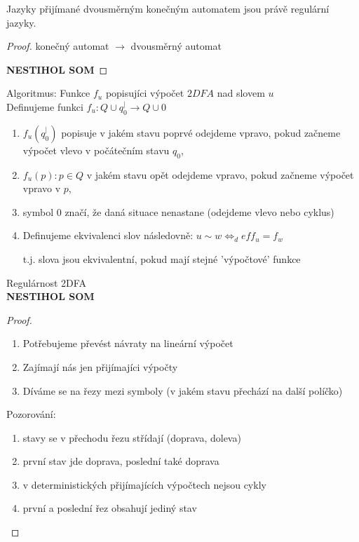 \documentclass[../main.tex]{subfiles}
\begin{document}
\begin{theorem}
    Jazyky přijímané dvousměrným konečným automatem jsou právě regulární jazyky.
    \begin{proof}
        konečný automat $\rightarrow$ dvousměrný automat
        
        \textbf{NESTIHOL SOM}
    \end{proof} 
\end{theorem}
\begin{theorem}
    Algoritmus: Funkce $f_u$ popisujíci výpočet $2DFA$ nad slovem $u$\\

    Definujeme funkci $f_u : Q \cup {q^|_0} \rightarrow Q\cup {0}$
    \begin{enumerate}
        \item $f_u(q^|_0)$ popisuje v jakém stavu poprvé odejdeme vpravo, pokud začneme výpočet vlevo v počátečním stavu $q_0$,
        \item $f_u(p): p \in Q$ v jakém stavu opět odejdeme vpravo, pokud začneme výpočet vpravo v $p$,
        \item symbol $0$ značí, že daná situace nenastane (odejdeme vlevo nebo cyklus)
        \item Definujeme ekvivalenci slov následovně: $u \sim w \Leftrightarrow_def f_u = f_w$
        \begin{remark}
            t.j. slova jsou ekvivalentní, pokud mají stejné 'výpočtové' funkce
        \end{remark}
    \end{enumerate}

    Regulárnost 2DFA\\

    \textbf{NESTIHOL SOM}
    
    \begin{proof}
        \begin{enumerate}
            \item Potřebujeme převést návraty na lineární výpočet
            \item Zajímají nás jen přijímajíci výpočty
            \item Díváme se na řezy mezi symboly (v jakém stavu přechází na další políčko)
        \end{enumerate}        

        Pozorování:
        \begin{enumerate}
            \item stavy se v přechodu řezu střídají (doprava, doleva)
            \item první stav jde doprava, poslední také doprava
            \item v deterministických přijímajících výpočtech nejsou cykly
            \item první a poslední řez obsahují jediný stav
        \end{enumerate}


\end{proof}
\end{theorem}
\end{document}
